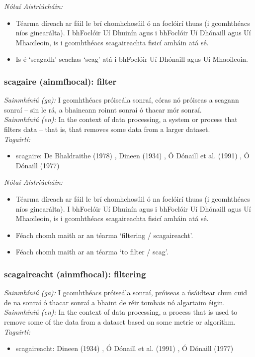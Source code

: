  \noindent \textit{Nótaí Aistriúcháin:}
\begin{itemize}
	\item Téarma díreach ar fáil le brí chomhchosúil ó na foclóirí thuas (i gcomhthéacs níos ginearálta). I bhFoclóir Uí Dhuinín agus i bhFoclóir Uí Dhónaill agus Uí Mhaoileoin, is i gcomhthéacs scagaireachta fisicí amháin atá sé.
	\item Is é `scagadh' seachas `scag' atá i bhFoclóir Uí Dhónaill agus Uí Mhaoileoin.
\end{itemize}


\subsubsection*{scagaire (ainmfhocal): filter}
 \noindent \textit{Sainmhíniú (ga):} I gcomhthéacs próiseála sonraí, córas nó próiseas a scagann sonraí -- sin le rá, a bhaineann roinnt sonraí ó thacar mór sonraí.
\\
 \noindent \textit{Sainmhíniú (en):} In the context of data processing, a system or process that filters data -- that is, that removes some data from a larger dataset.
\\
 \noindent \textit{Tagairtí:}
\begin{itemize}
	\item scagaire: De Bhaldraithe (1978) \cite{de-bhaldraithe}, Dineen (1934) \cite{dineen}, Ó Dónaill et al. (1991) \cite{focloir-beag}, Ó Dónaill (1977) \cite{odonaill}
\end{itemize}

 \noindent \textit{Nótaí Aistriúcháin:}
\begin{itemize}
	\item Téarma díreach ar fáil le brí chomhchosúil ó na foclóirí thuas (i gcomhthéacs níos ginearálta). I bhFoclóir Uí Dhuinín agus i bhFoclóir Uí Dhónaill agus Uí Mhaoileoin, is i gcomhthéacs scagaireachta fisicí amháin atá sé.
	\item Féach chomh maith ar an téarma `filtering / scagaireacht'.
	\item Féach chomh maith ar an téarma `to filter / scag'.
\end{itemize}


\subsubsection*{scagaireacht (ainmfhocal): filtering}
 \noindent \textit{Sainmhíniú (ga):} I gcomhthéacs próiseála sonraí, próiseas a úsáidtear chun cuid de na sonraí ó thacar sonraí a bhaint de réir tomhais nó algartaim éigin.
\\
 \noindent \textit{Sainmhíniú (en):} In the context of data processing, a process that is used to remove some of the data from a dataset based on some metric or algorithm.
\\
 \noindent \textit{Tagairtí:}
\begin{itemize}
	\item scagaireacht: Dineen (1934) \cite{dineen}, Ó Dónaill et al. (1991) \cite{focloir-beag}, Ó Dónaill (1977) \cite{odonaill}
\end{itemize}

